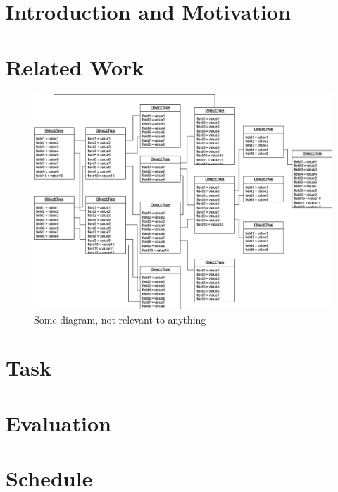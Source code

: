\documentclass[german=false,thesistype=bachelor,proposal]{tubsthesis}
\begin{document}
\begin{thesis}

\chapter{Introduction and Motivation}
\lipsum

\chapter{Related Work}
\lipsum[1-3]

\begin{figure}
\centering
\includegraphics[width=\textwidth]{images/example_diagram.png}
\caption{Some diagram, not relevant to anything~\cite{lisa}}
\label{fig:inga}
\end{figure}

\lipsum[4-5]

\chapter{Task}
\lipsum[1-3]

\chapter{Evaluation}
\lipsum[1-4]

\newpage
\chapter{Schedule}


\end{thesis}
\end{document}
